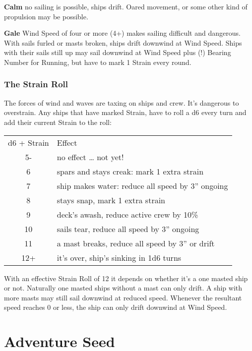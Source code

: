 \documentclass[11pt]{wbzine}
\begin{document}
\begin{multicols}{2}
\textbf{Calm} no sailing is possible, ships drift. Oared movement, or
some other kind of propulsion may be possible.

\textbf{Gale} Wind Speed of four or more (4+) makes sailing difficult
and dangerous. With sails furled or masts broken, ships drift downwind
at Wind Speed. Ships with their sails still up may sail downwind at Wind
Speed plus (!) Bearing Number for Running, but have to mark 1 Strain
every round.

\subsubsection{The Strain Roll}

The forces of wind and waves are taxing on ships and crew. It's
dangerous to overstrain. Any ships that have marked Strain, have to roll
a d6 every turn and add their current Strain to the roll:

\begin{tabularx}{\columnwidth}{cZ}
d6 + Strain & Effect \\
5- & no effect \ldots{} not yet! \\
6 & spars and stays creak: mark 1 extra strain \\
7 & ship makes water: reduce all speed by 3'' ongoing \\
8 & stays snap, mark 1 extra strain \\
9 & deck's awash, reduce active crew by 10\% \\
10 & sails tear, reduce all speed by 3'' ongoing \\
11 & a mast breaks, reduce all speed by 3'' or drift \\
12+ & it's over, ship's sinking in 1d6 turns \\
\end{tabularx}

With an effective Strain Roll of 12 it depends on whether it's a one
masted ship or not. Naturally one masted ships without a mast can only
drift. A ship with more masts may still sail downwind at reduced speed.
Whenever the resultant speed reaches 0 or less, the ship can only drift
downwind at Wind Speed.


\section{Adventure Seed}

\end{multicols}



\end{document}
